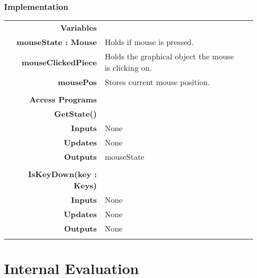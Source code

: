 \documentclass[10pt]{article}
\begin{document}
    \subsubsection{Implementation}
        \begin{tabularx}{\linewidth}{ >{\bfseries}r Xp{5cm} }
            Variables       & \begin{tabular}[t]{@{} l p{8cm}} 
                                     & \\
                                    mouseState : Mouse & Holds if mouse is pressed. \\
                                    mouseClickedPiece & Holds the graphical object the mouse is clicking on. \\
                                    mousePos & Stores current mouse position. \\
                              \end{tabular} \\

            Access Programs & \begin{tabular}[t]{@{} l p{8cm}} 
                                     & \\
                                    \bf{GetState()} & \\
                                    Inputs &  None \\
                                    Updates & None \\
                                    Outputs & mouseState \\
                                     & \\
                                    \bf{IsKeyDown(key : Keys)} & \\
                                    Inputs & None \\
                                    Updates & None \\
                                    Outputs & None \\ 
                              \end{tabular} \\
                              
        \end{tabularx}
        
        
        
\section{Internal Evaluation}


        
\end{document}
